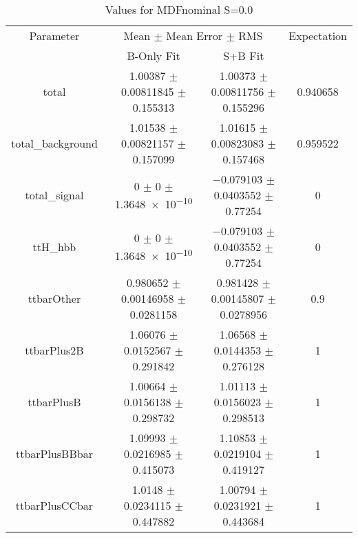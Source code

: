 \begin{table}
\centering
\caption{Values for MDFnominal S=0.0}
\begin{tabular}{cccc}
\toprule
Parameter & \multicolumn{2}{c}{Mean $\pm$ Mean Error $\pm$ RMS} & Expectation\\
 & B-Only Fit & S+B Fit & \\
\midrule
total & \num{1.00387} $\pm$ \num{0.00811845} $\pm$ \num{0.155313} & \num{1.00373} $\pm$ \num{0.00811756} $\pm$ \num{0.155296} & \num{0.940658}\\
total\_background & \num{1.01538} $\pm$ \num{0.00821157} $\pm$ \num{0.157099} & \num{1.01615} $\pm$ \num{0.00823083} $\pm$ \num{0.157468} & \num{0.959522}\\
total\_signal & \num{0} $\pm$ \num{0} $\pm$ \num{1.3648e-10} & \num{-0.079103} $\pm$ \num{0.0403552} $\pm$ \num{0.77254} & \num{0}\\
ttH\_hbb & \num{0} $\pm$ \num{0} $\pm$ \num{1.3648e-10} & \num{-0.079103} $\pm$ \num{0.0403552} $\pm$ \num{0.77254} & \num{0}\\
ttbarOther & \num{0.980652} $\pm$ \num{0.00146958} $\pm$ \num{0.0281158} & \num{0.981428} $\pm$ \num{0.00145807} $\pm$ \num{0.0278956} & \num{0.9}\\
ttbarPlus2B & \num{1.06076} $\pm$ \num{0.0152567} $\pm$ \num{0.291842} & \num{1.06568} $\pm$ \num{0.0144353} $\pm$ \num{0.276128} & \num{1}\\
ttbarPlusB & \num{1.00664} $\pm$ \num{0.0156138} $\pm$ \num{0.298732} & \num{1.01113} $\pm$ \num{0.0156023} $\pm$ \num{0.298513} & \num{1}\\
ttbarPlusBBbar & \num{1.09993} $\pm$ \num{0.0216985} $\pm$ \num{0.415073} & \num{1.10853} $\pm$ \num{0.0219104} $\pm$ \num{0.419127} & \num{1}\\
ttbarPlusCCbar & \num{1.0148} $\pm$ \num{0.0234115} $\pm$ \num{0.447882} & \num{1.00794} $\pm$ \num{0.0231921} $\pm$ \num{0.443684} & \num{1}\\
\bottomrule
\end{tabular}
\end{table}